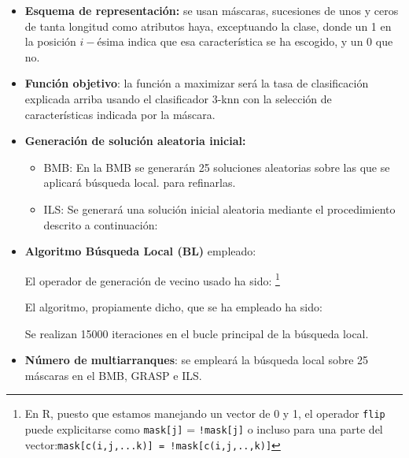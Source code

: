 \documentclass[a4paper,11pt]{article}
\begin{document}
\begin{itemize} 
\item \textbf{Esquema de representación:} se usan máscaras, sucesiones de unos y ceros de tanta longitud como atributos haya,
exceptuando la clase, donde un 1 en la posición $i-$ésima indica que esa característica se ha escogido, y un $0$ que no.

\item \textbf{Función objetivo}: la función a maximizar será la tasa de clasificación explicada arriba usando el clasificador
3-knn con la selección de características indicada por la máscara.\\

\small\texttt{}
\normalsize

\item \textbf{Generación de solución aleatoria inicial: }
  \begin{itemize}
   \item BMB: En la BMB se generarán 25 soluciones aleatorias sobre las que se aplicará búsqueda local.
   para refinarlas.\\
   
   \small\texttt{}
   \normalsize
   
   \item ILS: Se generará una solución inicial aleatoria mediante el procedimiento descrito a continuación:
   
   \small\texttt{}
   \normalsize
    
  \end{itemize}


\item \textbf{Algoritmo Búsqueda Local (BL)} empleado:
  
  El operador de generación de vecino usado ha sido:
  \footnote{En R, puesto que estamos manejando un vector de 0 y 1, el operador \texttt{flip} puede explicitarse como
  \texttt{mask[j]} = \texttt{!mask[j]} o incluso para una parte del vector:\quad \texttt{mask[c(i,j,...k)] = !mask[c(i,j,..,k)]}}\\
  
  \small\texttt{}
  \normalsize
  
  
  El algoritmo, propiamente dicho, que se ha empleado ha sido:\\
  
  \small\texttt{}
  
  Se realizan 15000 iteraciones en el bucle principal de la búsqueda local.

\item \textbf{Número de multiarranques}: se empleará la búsqueda local sobre 25 máscaras en el BMB, GRASP e ILS.

\end{itemize}
\end{document}
